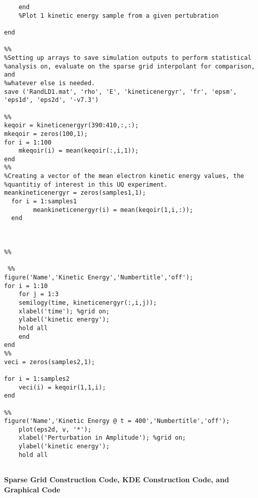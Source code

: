\documentclass{article}
\begin{document}
\begin{lstlisting}
    end
    %Plot 1 kinetic energy sample from a given pertubration

end

%%
%Setting up arrays to save simulation outputs to perform statistical
%analysis on, evaluate on the sparse grid interpolant for comparison, and
%whatever else is needed.
save ('RandLD1.mat', 'rho', 'E', 'kineticenergyr', 'fr', 'epsm', 'eps1d', 'eps2d', '-v7.3')

%% 
keqoir = kineticenergyr(390:410,:,:);
mkeqoir = zeros(100,1);
for i = 1:100
    mkeqoir(i) = mean(keqoir(:,i,1));
end
%%
%Creating a vector of the mean electron kinetic energy values, the
%quantitiy of interest in this UQ experiment.
meankineticenergyr = zeros(samples1,1);
  for i = 1:samples1
        meankineticenergyr(i) = mean(keqoir(1,i,:));
  end



%%

 %%
figure('Name','Kinetic Energy','Numbertitle','off');
for i = 1:10
    for j = 1:3
    semilogy(time, kineticenergyr(:,i,j));
    xlabel('time'); %grid on;
    ylabel('kinetic energy');
    hold all
    end
end
%%
veci = zeros(samples2,1);

for i = 1:samples2
    veci(i) = keqoir(1,1,i);
end

%%
figure('Name','Kinetic Energy @ t = 400','Numbertitle','off');
    plot(eps2d, v, '*');
    xlabel('Perturbation in Amplitude'); %grid on;
    ylabel('kinetic energy');
    hold all
    
\end{lstlisting}
\textbf{Sparse Grid Construction Code, KDE Construction Code, and Graphical Code}
\end{document}
